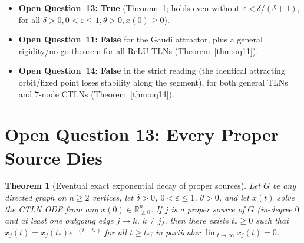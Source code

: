\documentclass[11pt]{article}
\theoremstyle{plain}
\newtheorem{theorem}{Theorem}
\theoremstyle{definition}
\theoremstyle{remark}
\begin{document}
\begin{itemize}[leftmargin=2em,itemsep=2pt]
\item \textbf{Open Question~13:} \textbf{True} (Theorem~\ref{thm:oq13}; holds even without $\varepsilon < \delta/(\delta+1)$, for all $\delta > 0, 0 < \varepsilon \le 1, \theta > 0, x(0) \ge 0$).
\item \textbf{Open Question~11:} \textbf{False} for the Gaudi attractor, plus a general rigidity/no-go theorem for all ReLU TLNs (Theorem~\ref{thm:oq11}).
\item \textbf{Open Question~14:} \textbf{False} in the strict reading (the identical attracting orbit/fixed point loses stability along the segment), for both general TLNs and 7-node CTLNs (Theorem~\ref{thm:oq14}).
\end{itemize}

\section{Open Question 13: Every Proper Source Dies}

\begin{theorem}[Eventual exact exponential decay of proper sources]\label{thm:oq13}
Let $G$ be any directed graph on $n \ge 2$ vertices, let $\delta > 0$, $0 < \varepsilon \le 1$, $\theta > 0$, and let $x(t)$ solve the CTLN ODE from any $x(0) \in \mathbb{R}_{\ge 0}^n$. If $j$ is a proper source of $G$ (in-degree $0$ and at least one outgoing edge $j \to k$, $k \neq j$), then there exists $t_* \ge 0$ such that $x_j(t) = x_j(t_*) e^{-(t - t_*)}$ for all $t \ge t_*$; in particular $\lim_{t \to \infty} x_j(t) = 0$.
\end{theorem}
\end{document}

